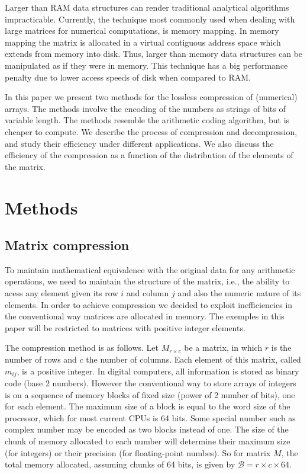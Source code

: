 \documentclass[10pt]{article}
\begin{document}
Larger than RAM data structures can render traditional analytical algorithms impracticable. Currently, the technique most commonly used when dealing with large matrices for numerical computations, is memory mapping\cite{van2011numpy,big}. In memory mapping the matrix is allocated in a virtual contiguous address space which extends from memory into disk. Thus, larger than memory data structures can be manipulated as if they were in memory.  This technique has a big performance penalty due to lower access speeds of disk when compared to RAM. 

In this paper we present two methods for the lossless compression of (numerical) arrays. The methods involve the encoding of the numbers as strings of bits of variable length. The methods resemble the arithmetic coding\cite{bodden2007arithmetic} algorithm, but is cheaper to compute. We describe the process of compression and decompression, and study their efficiency under different applications. We also discuss the efficiency of the compression as a function of the distribution of the elements of the matrix. 

\section*{Methods}

\subsection*{Matrix compression}

To maintain mathematical equivalence with the original data for any arithmetic operations, we need to  maintain the structure of the matrix, i.e., the ability to acess any element given its row $i$ and column $j$ and also the numeric nature of its elements. In order to achieve compression we decided to exploit inefficiencies in the conventional way matrices are allocated in memory. The exemples in this paper will be restricted to matrices with positive integer elements.

The compression method is as follows. Let $M_{r \times c}$ be a matrix, in which $r$ is the number of rows and $c$ the number of columns. Each element of this matrix, called $m_{ij}$, is a positive integer. In digital computers, all information is stored as binary code (base 2 numbers). However the conventional way to store arrays of integers is on a sequence of memory blocks of fixed size (power of 2 number of bits), one for each element. The maximum size of a block is equal to the word size of the processor, which for most current CPUs is 64 bits. Some special number such as complex number may be encoded as two blocks instead of one. The size of the chunk of memory allocated to each number will determine their maximum  size (for integers) or their precision (for floating-point numbes). So for matrix $M$, the total memory allocated, assuming chunks of 64 bits, is given by $\mathcal{B} = r \times c \times 64$.
\end{document}
